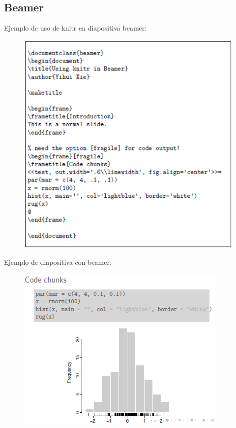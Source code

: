 \documentclass[10pt]{article}   			%
\begin{document}
\subsection{Beamer}

Ejemplo de uso de knitr en diapositiva beamer:

\begin{figure}[ht] 
	\centering
		\includegraphics[scale=0.9]{Beamer1}
		\label{fig:Padding1}
\end{figure}

\newpage
Ejemplo de diapositiva con beamer:

\begin{figure}[ht] 
	\centering
		\includegraphics[scale=1.2]{Beamer2} 
		\label{fig:Padding2}
\end{figure}
\end{document}
